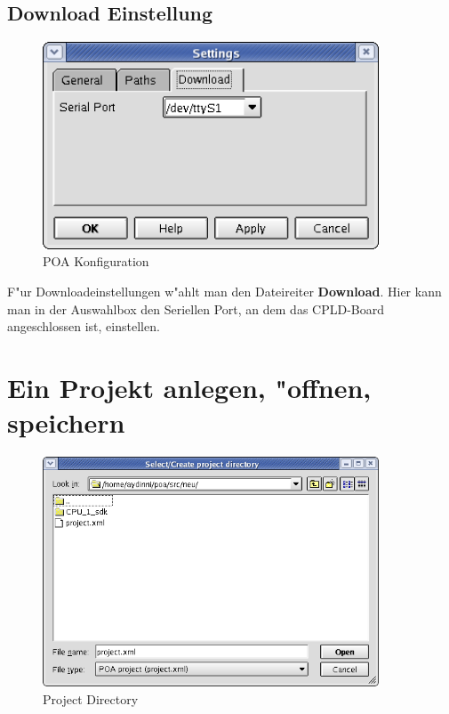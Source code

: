\documentclass[a4paper,titlepage,12pt,ngerman]{scrbook}
\begin{document}
\subsection{Download Einstellung}
\begin{figure}[htbp]

\begin{center}

\includegraphics[width=10cm]{POAConfiguration3}

\caption{POA Konfiguration}\label{test}

\end{center}

\end{figure}
F"ur Downloadeinstellungen w"ahlt man den Dateireiter {\bf Download}. Hier kann man in der Auswahlbox den Seriellen Port, an dem das CPLD-Board angeschlossen ist, einstellen.\par


\newpage
\section{Ein Projekt anlegen, "offnen, speichern}
\begin{figure}[htbp]

\begin{center}

\includegraphics[width=10cm]{Directory}

\caption{Project Directory}\label{test}

\end{center}

\end{figure}
\end{document}
